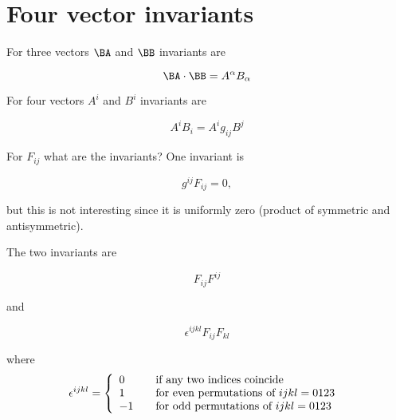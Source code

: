 %
%
\section{Four vector invariants}

For three vectors $\BA$ and $\BB$ invariants are

\begin{equation}\label{eqn:relativisticElectrodynamicsL11:510}
\BA \cdot \BB = A^\alpha B_\alpha
\end{equation}

For four vectors $A^i$ and $B^i$ invariants are

\begin{equation}\label{eqn:relativisticElectrodynamicsL11:530}
A^i B_i = A^i g_{i j} B^j  
\end{equation}

For $F_{i j}$ what are the invariants?  One invariant is

\begin{equation}\label{eqn:relativisticElectrodynamicsL11:550}
g^{i j} F_{i j} = 0,
\end{equation}

but this is not interesting since it is uniformly zero (product of symmetric and antisymmetric).

The two invariants are

\begin{equation}\label{eqn:relativisticElectrodynamicsL11:570}
F_{i j}F^{i j}
\end{equation}

and 

\begin{equation}\label{eqn:relativisticElectrodynamicsL11:590}
\epsilon^{i j k l} F_{i j}F_{k l}
\end{equation}

where
\begin{equation}\label{eqn:relativisticElectrodynamicsL11:610}
\epsilon^{i j k l} =
\left\{
\begin{array}{l l}
0 & \quad \mbox{if any two indices coincide} \\
1 & \quad \mbox{for even permutations of $i j k l=0123$ } \\
-1 & \quad \mbox{for odd permutations of $i j k l=0123$ } \\
\end{array}
\right.
\end{equation}


